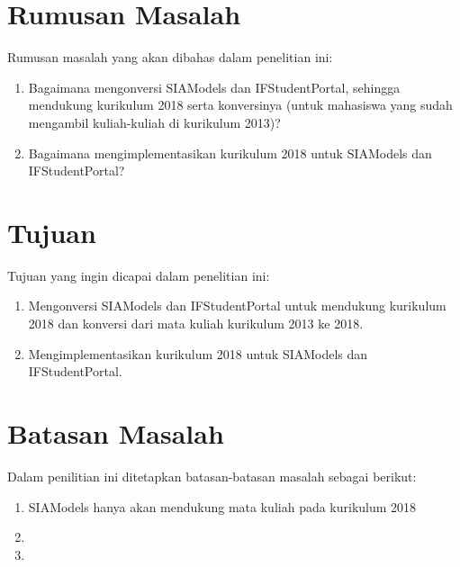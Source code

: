 
\section{Rumusan Masalah}
\label{sec:rumusan}
Rumusan masalah yang akan dibahas dalam penelitian ini:
\begin{enumerate}
	\item Bagaimana mengonversi SIAModels dan IFStudentPortal, sehingga mendukung kurikulum 2018 serta konversinya (untuk mahasiswa yang sudah mengambil kuliah-kuliah di kurikulum 2013)?
	\item Bagaimana mengimplementasikan kurikulum 2018 untuk SIAModels dan IFStudentPortal?
\end{enumerate}


\section{Tujuan}
\label{sec:tujuan}
Tujuan yang ingin dicapai dalam penelitian ini:
\begin{enumerate}
	\item Mengonversi SIAModels dan IFStudentPortal untuk mendukung kurikulum 2018 dan konversi dari mata kuliah kurikulum 2013 ke 2018.
	\item Mengimplementasikan kurikulum 2018 untuk SIAModels dan IFStudentPortal.
\end{enumerate}


\section{Batasan Masalah}
\label{sec:batasan}
Dalam penilitian ini ditetapkan batasan-batasan masalah sebagai berikut:
\begin{enumerate}
	\item SIAModels hanya akan mendukung mata kuliah pada kurikulum 2018
	\item 
	\item
\end{enumerate}



